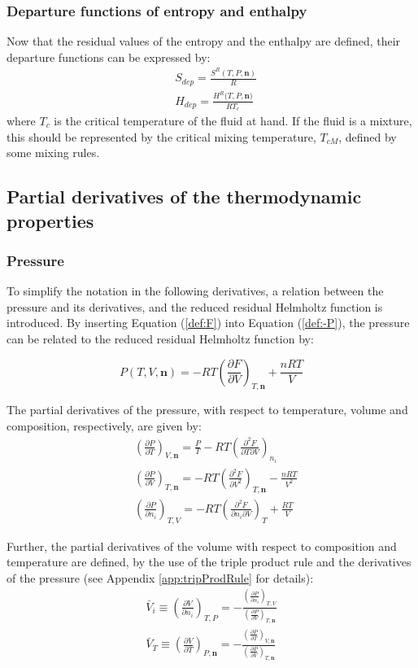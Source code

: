 \documentclass[english]{../thermomemo/thermomemo}
\numberwithin{equation}{section}
\newcommand*{\pder}[2]{\left(\frac{\partial #1}{\partial #2}\right)}
\newcommand*{\pdder}[2]{\left(\frac{\partial^2 #1}{\partial #2^2}\right)}
\newcommand*{\pdcross}[3]{\left(\frac{\partial^2 #1}{\partial #2 \partial #3}\right)}
\newcommand*{\reff}[1]{(\ref{#1})}
\begin{document}
\subsubsection*{Departure functions of entropy and enthalpy}
Now that the residual values of the entropy and the enthalpy are defined, their departure functions can be expressed by:
\begin{align}
& S_{dep} = \frac{S^R(T,P,\textbf{n})}{R} \\
& H_{dep} = \frac{H^R(T,P,\textbf{n)}}{R T_c}
\end{align}
where $T_c$ is the critical temperature of the fluid at hand. If the fluid is a mixture, this should be represented by the critical mixing temperature, $T_{cM}$, defined by some mixing rules.
\subsection{Partial derivatives of the thermodynamic properties}

\subsubsection*{Pressure}
To simplify the notation in the following derivatives, a relation between the pressure and its derivatives, and the reduced residual Helmholtz function is introduced. By inserting Equation \reff{def:F} into Equation \reff{def:-P}, the pressure can be related to the reduced residual Helmholtz function by:

\begin{equation}
\label{def:P}
P(T,V,\textbf{n}) = -RT \left( \frac{\partial F}{\partial V} \right)_{T, \textbf{n}} + \frac{nRT}{V}
\end{equation}

The partial derivatives of the pressure, with respect to temperature, volume and composition, respectively, are given by:
\begin{align}
\label{eq:P_T}
& \pder{P}{T}_{V, \textbf{n}} = \frac{P}{T} - RT \pdcross{F}{T}{V}_{n_i} \\
\label{eq:P_V}
& \pder{P}{V}_{T, \textbf{n}} = -RT \pdder{F}{V}_{T, \textbf{n}} - \frac{nRT}{V^2} \\
\label{eq:P_i}
& \pder{P}{n_i}_{T,V} = -RT \pdcross{F}{n_i}{V}_T + \frac{RT}{V}
\end{align}

Further, the partial derivatives of the volume with respect to composition and temperature are defined, by the use of the triple product rule and the derivatives of the pressure (see Appendix \ref{app:tripProdRule} for details):
\begin{align}
\label{def:V_i}
\bar{V}_i \equiv \pder{V}{n_i}_{T,P} =  - \frac{\pder{P}{n_i}_{T,V}}{\pder{P}{V}_{T,\textbf{n}}} \\
\label{def:V_T}
\bar{V}_T \equiv \pder{V}{T}_{P,\textbf{n}} =  - \frac{\pder{P}{T}_{V,\textbf{n}}}{\pder{P}{V}_{T,\textbf{n}}}
\end{align}
\end{document}
